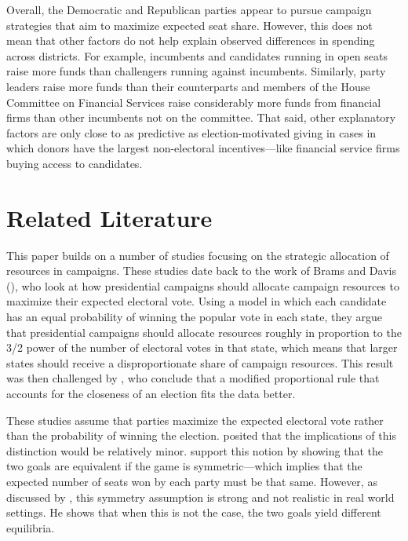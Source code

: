 \documentclass[12pt,final,fleqn]{article}
\theoremstyle{plain}
\begin{document}
Overall, the Democratic and Republican parties appear to pursue campaign strategies that aim to maximize expected seat share. However, this does not mean that other factors do not help explain observed differences in spending across districts. For example, incumbents and candidates running in open seats raise more funds than challengers running against incumbents. Similarly, party leaders raise more funds than their counterparts and members of the House Committee on Financial Services raise considerably more funds from financial firms than other incumbents not on the committee. That said, other explanatory factors are only close to as predictive as election-motivated giving in cases in which donors have the largest non-electoral incentives---like financial service firms buying access to candidates. 

\section{Related Literature} \label{sec: related literature}
This paper builds on a number of studies focusing on the strategic allocation of resources in campaigns. These studies date back to the work of Brams and Davis (\citeyear{brams1973resource, brams19743}), who look at how presidential campaigns should allocate campaign resources to maximize their expected electoral vote. Using a model in which each candidate has an equal probability of winning the popular vote in each state, they argue that presidential campaigns should allocate resources roughly in proportion to the 3/2 power of the number of electoral votes in that state, which means that larger states should receive a disproportionate share of campaign resources. This result was then challenged by \citet{colantoni1975campaign}, who conclude that a modified proportional rule that accounts for the closeness of an election fits the data better.

These studies assume that parties maximize the expected electoral vote rather than the probability of winning the election. \citet{brams1973resource} posited that the implications of this distinction would be relatively minor. \citet{aranson1974election} support this notion by showing that the two goals are equivalent if the game is symmetric---which implies that the expected number of seats won by each party must be that same. However, as discussed by \citet{snyder1989election}, this symmetry assumption is strong and not realistic in real world settings. He shows that when this is not the case, the two goals yield different equilibria.
\end{document}

